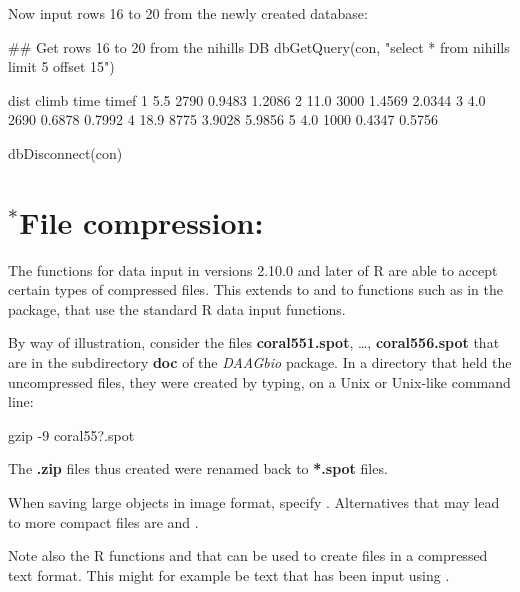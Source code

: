 Now input rows 16 to 20 from the newly created database:
\begin{Schunk}
\begin{Sinput}
## Get rows 16 to 20 from the nihills DB
dbGetQuery(con,
  "select * from nihills limit 5 offset 15")
\end{Sinput}
\begin{Soutput}
  dist climb   time  timef
1  5.5  2790 0.9483 1.2086
2 11.0  3000 1.4569 2.0344
3  4.0  2690 0.6878 0.7992
4 18.9  8775 3.9028 5.9856
5  4.0  1000 0.4347 0.5756
\end{Soutput}
\begin{Sinput}
dbDisconnect(con)
\end{Sinput}
\end{Schunk}

\section{$^*$File compression:} The functions for data
input in versions 2.10.0 and later of R are able to accept certain
types of compressed files.  This extends to  and to
functions such as  in the 
package, that use the standard R data input functions.

By way of illustration, consider the files \textbf{coral551.spot},
\ldots, \textbf{coral556.spot} that are in the subdirectory
\textbf{doc} of the \textit{DAAGbio} package. In a directory that held
the uncompressed files, they were created by typing, on a Unix or
Unix-like command line: 
\begin{Schunk}
\begin{Sinput}
gzip -9 coral55?.spot
\end{Sinput}
\end{Schunk}
\noindent
The {\bf .zip} files thus created were renamed back to
\textbf{*.spot} files.

When saving large objects in image format, specify .
Alternatives that may lead to more compact files are 
and .

Note also the R functions  and  that can
be used to create files in a compressed text format.  This might for
example be text that has been input using .

